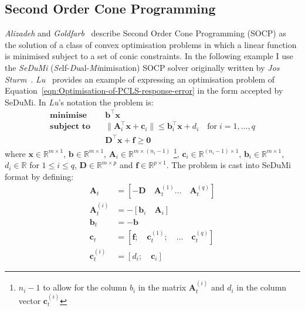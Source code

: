 \documentclass[a4paper,twoside,10pt,english]{article}
\begin{document}
\subsection{Second Order Cone Programming}
 \emph{Alizadeh} and \emph{Goldfarb}~\cite
{AlizadehGoldfarb_SecondOrderCone} describe Second Order Cone
Programming (SOCP) as the solution of a class of convex optimisation problems in
which a linear function is minimised subject to a set of conic constraints.
In the following example I use the \emph{SeDuMi}
(\emph{Se}lf-\emph{Du}al-\emph{Mi}nimisation) SOCP solver originally written
by \emph{Jos Sturm}~\cite{Sturm_SeDuMi_GitHub}. 
\emph{Lu}~\cite[Section III]{Lu_SedumiRemarks} provides an example of expressing
an optimisation problem of
Equation~\ref{eqn:Optimisation-of-PCLS-response-error} in the form accepted by
SeDuMi. In \emph{Lu}'s notation the problem is:
\begin{subequations}
\begin{align}
\textbf{minimise}  \quad&\boldsymbol{b}^{\top}\boldsymbol{x}
\label{eqn:Lu-SeDuMi-Remarks-problem-format}\\
\textbf{subject to}\quad&\|\boldsymbol{A}_{i}^{\top}\boldsymbol{x}+
\boldsymbol{c}_{i}\| \le \boldsymbol{b}_{i}^{\top}\boldsymbol{x}+d_{i}
\quad \text{for}\;i=1,\hdots,q
\label{eqn:Lu-SeDuMi-Remarks-problem-format-conic-constraints}\\
&\boldsymbol{D}^{\top}\boldsymbol{x}+\boldsymbol{f}\ge\boldsymbol{0}
\label{eqn:Lu-SeDuMi-Remarks-problem-format-linear-constraints}
\end{align}
\end{subequations}
where $\boldsymbol{x}\in\mathfrak{\mathbb{R}}^{m\times 1}$, 
$\boldsymbol{b}\in\mathfrak{\mathbb{R}}^{m\times 1}$,
$\boldsymbol{A}_{i}\in\mathfrak{\mathbb{R}}^{m\times\left(n_{i}-1\right)}$
\footnote{$n_{i}-1$ to allow for the column $b_{i}$ in the matrix 
$\boldsymbol{A}_{t}^{\left(i\right)}$ and $d_{i}$ in the column vector 
$\boldsymbol{c}_{t}^{\left(i\right)}$}, 
$\boldsymbol{c}_{i}\in\mathfrak{\mathbb{R}}^{\left(n_{i}-1\right)\times 1}$,
$\boldsymbol{b}_{i}\in\mathfrak{\mathbb{R}}^{m\times 1}$, 
$d_{i}\in\mathfrak{\mathbb{R}}$ for $1 \le i \le q$,
$\boldsymbol{D}\in\mathfrak{\mathbb{R}}^{m\times p}$ and
$\boldsymbol{f}\in\mathfrak{\mathbb{R}}^{p\times 1}$. The problem is cast into
SeDuMi format by defining:
\begin{align*}
\boldsymbol{A}_{t}&=\left[-\boldsymbol{D} \quad \boldsymbol{A}_{t}^{\left(1\right)}
\hdots \quad \boldsymbol{A}_{t}^{\left(q\right)}\right]\\
\boldsymbol{A}_{t}^{\left(i\right)} &= -\left[\boldsymbol{b}_{i} \quad
\boldsymbol{A}_{i}\right]\nonumber\\
\boldsymbol{b}_{t}&=-\boldsymbol{b}\nonumber\\
\boldsymbol{c}_{t}&=\left[\boldsymbol{f};\quad \boldsymbol{c}_{t}^{\left(1\right)}
;\quad \hdots\quad \boldsymbol{c}_{t}^{\left(q\right)}\right]\nonumber\\
\boldsymbol{c}_{t}^{\left(i\right)}&=\left[d_{i} ;\quad \boldsymbol{c}_{i}\right]
\nonumber
\end{align*}
\end{document}
